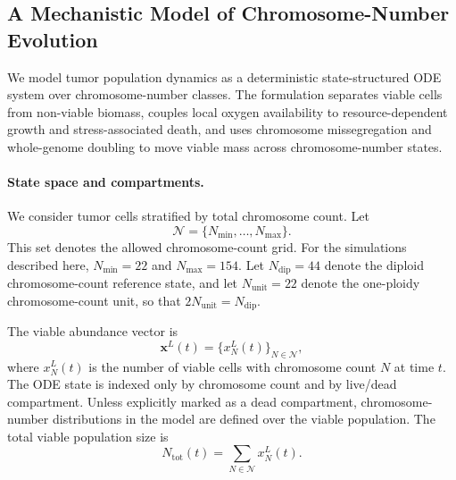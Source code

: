 \documentclass[11pt]{article}
\begin{document}
\subsection{A Mechanistic Model of Chromosome-Number Evolution}
\label{ode}

We model tumor population dynamics as a deterministic state-structured ODE system over chromosome-number classes. The formulation separates viable cells from non-viable biomass, couples local oxygen availability to resource-dependent growth and stress-associated death, and uses chromosome missegregation and whole-genome doubling to move viable mass across chromosome-number states.

\paragraph{State space and compartments.}

We consider tumor cells stratified by total chromosome count. Let
\begin{equation}
\mathcal{N}=\{N_{\min},\dots,N_{\max}\}.
\label{eq:appendix_state_grid}
\end{equation}
This set denotes the allowed chromosome-count grid. For the simulations described here, $N_{\min}=22$ and $N_{\max}=154$. Let $N_{\mathrm{dip}}=44$ denote the diploid chromosome-count reference state, and let $N_{\mathrm{unit}}=22$ denote the one-ploidy chromosome-count unit, so that $2N_{\mathrm{unit}}=N_{\mathrm{dip}}$.

The viable abundance vector is
\begin{equation}
\mathbf{x}^L(t)=\{x_N^L(t)\}_{N\in\mathcal N},
\label{eq:appendix_viable_vector}
\end{equation}
where $x_N^L(t)$ is the number of viable cells with chromosome count $N$ at time $t$. The ODE state is indexed only by chromosome count and by live/dead compartment. Unless explicitly marked as a dead compartment, chromosome-number distributions in the model are defined over the viable population. The total viable population size is
\begin{equation}
N_{\mathrm{tot}}(t)=\sum_{N\in\mathcal N}x_N^L(t).
\label{eq:appendix_total_viable_population}
\end{equation}
\end{document}
